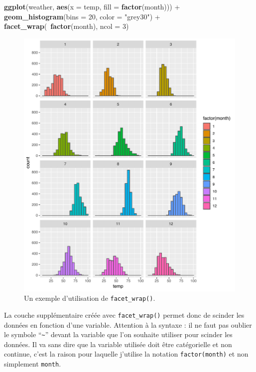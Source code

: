 \documentclass[a4paperpaper,]{article}
\newenvironment{Shaded}{\begin{snugshade}}{\end{snugshade}}
\newcommand{\DataTypeTok}[1]{\textcolor[rgb]{0.00,0.34,0.68}{#1}}
\newcommand{\DecValTok}[1]{\textcolor[rgb]{0.69,0.50,0.00}{#1}}
\newcommand{\KeywordTok}[1]{\textcolor[rgb]{0.12,0.11,0.11}{\textbf{#1}}}
\newcommand{\NormalTok}[1]{\textcolor[rgb]{0.12,0.11,0.11}{#1}}
\newcommand{\OperatorTok}[1]{\textcolor[rgb]{0.12,0.11,0.11}{#1}}
\newcommand{\StringTok}[1]{\textcolor[rgb]{0.75,0.01,0.01}{#1}}
\begin{document}
\begin{Shaded}
\begin{Highlighting}[]
\KeywordTok{ggplot}\NormalTok{(weather, }\KeywordTok{aes}\NormalTok{(}\DataTypeTok{x =}\NormalTok{ temp, }\DataTypeTok{fill =} \KeywordTok{factor}\NormalTok{(month))) }\OperatorTok{+}
\StringTok{  }\KeywordTok{geom_histogram}\NormalTok{(}\DataTypeTok{bins =} \DecValTok{20}\NormalTok{, }\DataTypeTok{color =} \StringTok{"grey30"}\NormalTok{) }\OperatorTok{+}
\StringTok{  }\KeywordTok{facet_wrap}\NormalTok{(}\OperatorTok{~}\KeywordTok{factor}\NormalTok{(month), }\DataTypeTok{ncol =} \DecValTok{3}\NormalTok{)}
\end{Highlighting}
\end{Shaded}

\begin{figure}[htpb]

{\centering \includegraphics[width=0.9\linewidth]{figure/wrap-1} 

}

\caption{Un exemple d'utilisation de \texttt{facet\_wrap()}.}\label{fig:wrap}
\end{figure}



La couche supplémentaire créée avec \texttt{facet\_wrap()} permet donc de scinder les données en fonction d'une variable. Attention à la syntaxe : il ne faut pas oublier le symbole ``\texttt{\textasciitilde{}}'' devant la variable que l'on souhaite utiliser pour scinder les données. Il va sans dire que la variable utilisée doit être catégorielle et non continue, c'est la raison pour laquelle j'utilise la notation \texttt{factor(month)} et non simplement \texttt{month}.
\end{document}
